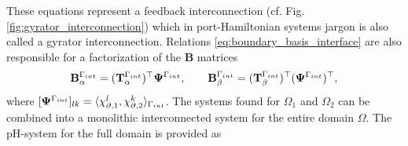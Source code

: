 \documentclass[11pt,a4paper]{article}
\newcommand{\boundary}[3][\partial\Omega]{\langle #2, #3\rangle_{#1}}
\begin{document}
These equations represent a feedback interconnection (cf. Fig. \ref{fig:gyrator_interconnection}) which in port-Hamiltonian systems jargon is also called a gyrator interconnection. Relations \eqref{eq:boundary_basis_interface} are also responsible for a factorization of the $\mathbf{B}$ matrices
\begin{equation}
    \mathbf{B}_\alpha^{\Gamma_{\rm int}} = (\mathbf{T}_\alpha^{\Gamma_{\rm int}})^\top \mathbf{\Psi}^{\Gamma_{\rm int}}, \qquad \mathbf{B}_\beta^{\Gamma_{\rm int}} = (\mathbf{T}_\beta^{\Gamma_{\rm int}})^\top (\mathbf{\Psi}^{\Gamma_{\rm int}})^\top,
\end{equation}
where $[\mathbf{\Psi}^{\Gamma_{\rm int}}]_{lk} = \boundary[\Gamma_{\rm int}]{\chi_{\partial, 1}^l}{\chi_{\partial, 2}^k}$. The systems found for $\Omega_1$ and $\Omega_2$ can be combined into a monolithic interconnected system for the entire domain $\Omega$. The pH-system for the full domain is provided as
\end{document}
